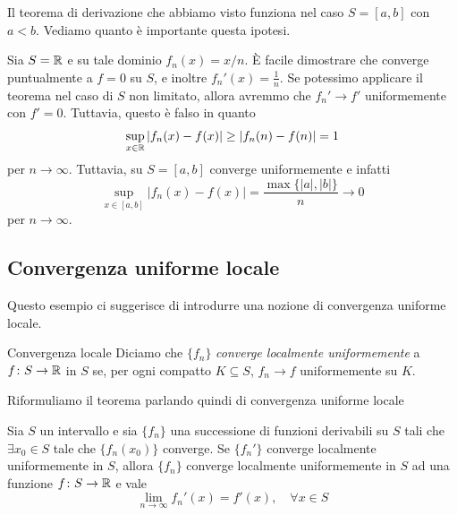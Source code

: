 \documentclass[a4paper]{article}
\begin{document}
\begin{radioactive}
Il teorema di derivazione che abbiamo visto funziona nel caso
\(S = [a,b]\) con \(a<b\).
Vediamo quanto è importante questa ipotesi.
\end{radioactive}

\begin{radioactive}
\begin{snippetexample}{}
    Sia \(S = \mathbb{R}\) e su tale dominio \(f_n(x) = x/n\).
    È facile dimostrare che converge puntualmente a \(f=0\) su \(S\),
    e inoltre
    \(f_n'(x) = \frac1n\).
    Se potessimo applicare il teorema nel caso di \(S\) non limitato,
    allora avremmo che \(f_n' \to f'\) uniformemente con \(f' = 0\).
    Tuttavia, questo è falso in quanto
    \begin{align*}
        \sup_{x\in\mathbb{R}}|f_n(x)-f(x)|
        \geq |f_n(n)-f(n)|=1
    \end{align*}
    per \(n \to \infty\).
    Tuttavia, su \(S = [a,b]\) converge uniformemente e infatti
    \[
        \sup_{x\in [a,b]} |f_n(x) - f(x)| = \frac{\max\{|a|,|b|\}}{n} \to 0
    \]
    per \(n \to \infty\).
\end{snippetexample}
\end{radioactive}

\subsection{Convergenza uniforme locale}

\begin{radioactive}
Questo esempio ci suggerisce di introdurre
una nozione di convergenza uniforme locale.
\end{radioactive}

\begin{radioactive}
\begin{snippetdefinition}{Convergenza locale}
    Diciamo che \(\{f_n\}\)
    \emph{converge localmente uniformemente} a \(f \colon S \to \mathbb{R}\)
    in \(S\) se, per ogni compatto \(K\subseteq S\), \(f_n\to f\) uniformemente su \(K\).
\end{snippetdefinition}
\end{radioactive}

\begin{radioactive}
Riformuliamo il teorema parlando quindi di convergenza uniforme locale
\end{radioactive}

\begin{radioactive}
\begin{snippettheorem}{}
    Sia \(S\) un intervallo e sia \(\{f_n\}\) una successione di funzioni derivabili su \(S\)
    tali che \(\exists x_0 \in S\) tale che \(\{f_n(x_0)\}\) converge.
    Se \(\{f_n'\}\) converge localmente uniformemente in \(S\),
    allora \(\{f_n\}\) converge localmente uniformemente in \(S\) ad una funzione \(f\colon S \to \mathbb{R}\)
    e vale
    \[
        \lim_{n\to\infty} f_n'(x) = f'(x), \quad \forall x \in S
    \]
\end{snippettheorem}
\end{radioactive}
\end{document}
